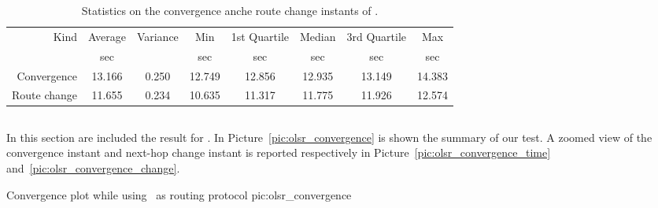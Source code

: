        \begin{table}[htbp]
            \centering
            \begin{tabular}{rccccccc}
            \toprule
            Kind & Average & Variance & Min & 1st Quartile &
            Median & 3rd Quartile & Max \\
            & \footnotesize{sec} & & \footnotesize{sec} & \footnotesize{sec} &
            \footnotesize{sec} & \footnotesize{sec} & \footnotesize{sec} \\
            \midrule
            Convergence & 13.166  & 0.250 & 12.749 & 12.856 & 12.935 & 13.149 &14.383\\
            Route change & 11.655 & 0.234 & 10.635 & 11.317 & 11.775 & 11.926 & 12.574\\
            \bottomrule
            \end{tabular}
            \caption{Statistics on the convergence anche route change
              instants of \batman.}
            \label{tab:convergence_batman}
        \end{table}

\clearpage
\subsection{\olsr}
In this section are included the result for \olsr.
In Picture~\ref{pic:olsr_convergence} is shown the summary of our
test. A zoomed view of the convergence instant and next-hop change
instant is reported respectively in
Picture~\ref{pic:olsr_convergence_time} and~\ref{pic:olsr_convergence_change}.

               {\textwidth}
               {Convergence plot while using \olsr\ as routing protocol}
               {pic:olsr_convergence}

